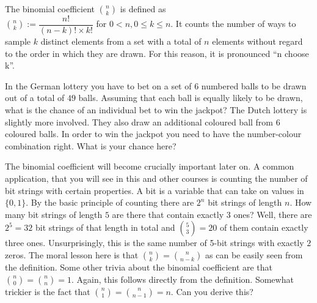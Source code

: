 \begin{Definition}
The binomial coefficient $ \binom{n}{k} $ is defined as \\ $ \binom{n}{k} := \dfrac{n!}{(n-k)!\times k!} $ for $ 0 < n, 0 \leq k \leq n $. 
It counts the number of ways
to sample $ k $ distinct elements from a set with a total of $ n $ elements without regard to the order in which they are drawn.
For this reason, it is pronounced ``n choose k''.
\end{Definition}

\begin{Exercise}
In the German lottery you have to bet on a set of $ 6 $ numbered balls to be drawn out of a total of $ 49 $ balls. Assuming that
each ball is equally likely to be drawn, what is the chance of an individual bet to win the jackpot? The Dutch lottery is 
slightly more involved. They also draw an additional coloured ball from $ 6 $ coloured balls. In order to win the jackpot you need to have 
the number-colour combination right. What is your chance here?
\end{Exercise}

The binomial coefficient will become crucially important later on. A common application, that you will see in this and other courses
is counting the number of bit strings with certain properties. A bit is a variable that can take on values in $ \{0,1\} $. By the 
basic principle of counting there are $ 2^{n} $ bit strings of length $ n $. How many bit strings of length $ 5 $ are there that contain
exactly $ 3 $ ones? Well, there are $ 2^{5} = 32 $ bit strings of that length in total and $ \binom{5}{3} = 20 $ of them contain exactly
three ones. Unsurprisingly, this is the same number of 5-bit strings with exactly $ 2 $ zeros. 
The moral lesson here is that $ \binom{n}{k} = \binom{n}{n-k} $ as can be easily seen from the definition. Some other trivia about the
binomial coefficient are that $ \binom{n}{0} = \binom{n}{n} = 1 $. Again, this follows directly from the definition. Somewhat trickier
is the fact that $ \binom{n}{1} = \binom{n}{n-1} = n $. Can you derive this?

